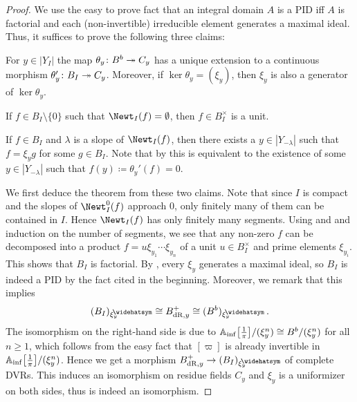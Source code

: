 \begin{proof}
	We use the easy to prove fact that an integral domain $A$ is a PID iff $A$ is factorial and each (non-invertible) irreducible element generates a maximal ideal. Thus, it suffices to prove the following three claims:
	\begin{numerate}
		\item For $y\in |Y_I|$ the map $\theta_y\colon B^b\epimorphism C_y$ has a unique extension to a continuous morphism $\theta_y'\colon B_I\epimorphism C_y$. Moreover, if $\ker \theta_y=(\xi_y)$, then $\xi_y$ is also a generator of $\ker\theta_y$.
		\item If $f\in B_I\setminus\{0\}$ such that $\Newt_I(f)=\emptyset$, then $f\in B_I^\times$ is a unit.
		\item If $f\in B_I$ and $\lambda$ is a slope of $\Newt_I(f)$, then there exists a $y\in|Y_{-\lambda}|$ such that $f=\xi_yg$ for some $g\in B_I$. Note that by  this is equivalent to the existence of some $y\in |Y_{-\lambda}|$ such that $f(y)\coloneqq\theta_y'(f)=0$.
	\end{numerate}
	We first deduce the theorem from these two claims. Note that since $I$ is compact and the slopes of $\Newt_I^0(f)$ approach $0$, only finitely many of them can be contained in $I$. Hence $\Newt_I(f)$ has only finitely many segments. Using  and  and induction on the number of segments, we see that any non-zero $f$ can be decomposed into a product $f=u\xi_{y_1}\dotsm\xi_{y_n}$ of a unit $u\in B_I^\times$ and prime elements $\xi_{y_i}$. This shows that $B_I$ is factorial. By , every $\xi_y$ generates a maximal ideal, so $B_I$ is indeed a PID by the fact cited in the beginning. Moreover, we remark that this implies
	\begin{equation*}
		(B_I)_{\xi_y}^\complete\cong B_{\dR,y}^+\cong(B^b)_{\xi_y}^\complete\,.
	\end{equation*}
	The isomorphism on the right-hand side is due to $\mathbb{A}_{\mathrm{inf}}\big[\textstyle\frac{1}{\pi}\big]/(\xi_y^n)\cong B^b/(\xi_y^n)$ for all $n\geq 1$, which follows from the easy fact that $[\varpi]$ is already invertible in $\mathbb{A}_{\mathrm{inf}}\big[\textstyle\frac{1}{\pi}\big]/(\xi_y^n)$. Hence we get a morphism $B_{\dR,y}^+\morphism (B_I)_{\xi_y}^\complete$ of complete DVRs. This induces an isomorphism on residue fields $C_y$ and $\xi_y$ is a uniformizer on both sides, thus is indeed an isomorphism.



\end{proof}
